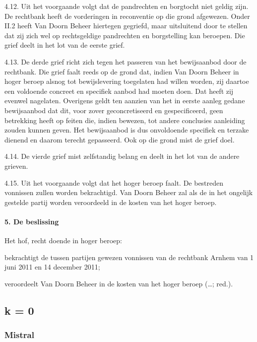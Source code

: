 \documentclass[
  dutch,
  a4paper,
]{article}
\begin{document}
4.12. Uit het voorgaande volgt dat de pandrechten en borgtocht niet geldig zijn. De rechtbank heeft de vorderingen in reconventie op die grond afgewezen. Onder II.2 heeft Van Doorn Beheer hiertegen gegriefd, maar uitsluitend door te stellen dat zij zich wel op rechtsgeldige pandrechten en borgstelling kan beroepen. Die grief deelt in het lot van de eerste grief.

4.13. De derde grief richt zich tegen het passeren van het bewijsaanbod door de rechtbank. Die grief faalt reeds op de grond dat, indien Van Doorn Beheer in hoger beroep alsnog tot bewijslevering toegelaten had willen worden, zij daartoe een voldoende concreet en specifiek aanbod had moeten doen. Dat heeft zij evenwel nagelaten. Overigens geldt ten aanzien van het in eerste aanleg gedane bewijsaanbod dat dit, voor zover geconcretiseerd en gespecificeerd, geen betrekking heeft op feiten die, indien bewezen, tot andere conclusies aanleiding zouden kunnen geven. Het bewijsaanbod is dus onvoldoende specifiek en terzake dienend en daarom terecht gepasseerd. Ook op die grond mist de grief doel.

4.14. De vierde grief mist zelfstandig belang en deelt in het lot van de andere grieven.

4.15. Uit het voorgaande volgt dat het hoger beroep faalt. De bestreden vonnissen zullen worden bekrachtigd. Van Doorn Beheer zal als de in het ongelijk gestelde partij worden veroordeeld in de kosten van het hoger beroep.

\paragraph{5. De beslissing}\label{de-beslissing}

Het hof, recht doende in hoger beroep:

bekrachtigt de tussen partijen gewezen vonnissen van de rechtbank Arnhem van 1 juni 2011 en 14 december 2011;

veroordeelt Van Doorn Beheer in de kosten van het hoger beroep (\ldots; red.).

\newpage


\subsection{k = 0}\label{k-0}

\subsubsection{Mistral}\label{mistral}
\end{document}
